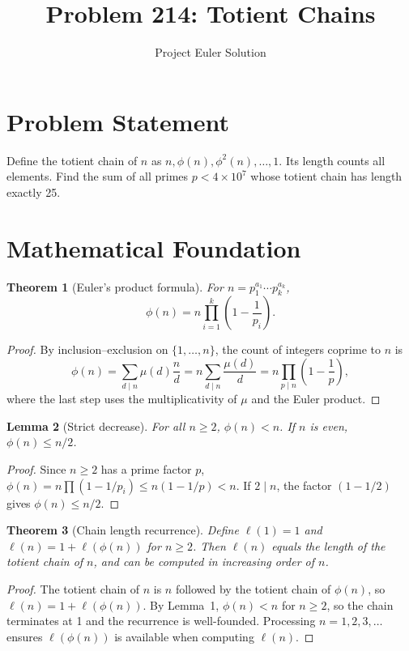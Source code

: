 \documentclass[12pt]{article}
\title{Problem 214: Totient Chains}
\author{Project Euler Solution}
\date{}
\newtheorem{theorem}{Theorem}
\newtheorem{lemma}[theorem]{Lemma}
\begin{document}
\maketitle

\section{Problem Statement}

Define the totient chain of $n$ as $n, \phi(n), \phi^2(n), \ldots, 1$. Its length counts all elements. Find the sum of all primes $p < 4 \times 10^7$ whose totient chain has length exactly 25.

\section{Mathematical Foundation}

\begin{theorem}[Euler's product formula]
For $n = p_1^{a_1}\cdots p_k^{a_k}$,
\[
\phi(n) = n\prod_{i=1}^{k}\left(1 - \frac{1}{p_i}\right).
\]
\end{theorem}

\begin{proof}
By inclusion--exclusion on $\{1,\ldots,n\}$, the count of integers coprime to $n$ is
\[
\phi(n) = \sum_{d \mid n}\mu(d)\frac{n}{d} = n\sum_{d \mid n}\frac{\mu(d)}{d} = n\prod_{p \mid n}\left(1-\frac{1}{p}\right),
\]
where the last step uses the multiplicativity of $\mu$ and the Euler product.
\end{proof}

\begin{lemma}[Strict decrease]
For all $n \geq 2$, $\phi(n) < n$. If $n$ is even, $\phi(n) \leq n/2$.
\end{lemma}

\begin{proof}
Since $n \geq 2$ has a prime factor $p$, $\phi(n) = n\prod(1-1/p_i) \leq n(1-1/p) < n$. If $2 \mid n$, the factor $(1-1/2)$ gives $\phi(n) \leq n/2$.
\end{proof}

\begin{theorem}[Chain length recurrence]
Define $\ell(1) = 1$ and $\ell(n) = 1 + \ell(\phi(n))$ for $n \geq 2$. Then $\ell(n)$ equals the length of the totient chain of $n$, and can be computed in increasing order of $n$.
\end{theorem}

\begin{proof}
The totient chain of $n$ is $n$ followed by the totient chain of $\phi(n)$, so $\ell(n) = 1 + \ell(\phi(n))$. By Lemma~1, $\phi(n) < n$ for $n \geq 2$, so the chain terminates at 1 and the recurrence is well-founded. Processing $n = 1, 2, 3, \ldots$ ensures $\ell(\phi(n))$ is available when computing $\ell(n)$.
\end{proof}
\end{document}
